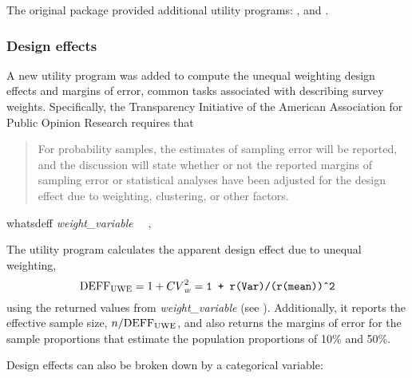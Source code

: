 The original package  provided additional utility programs:
,  and .

\subsubsection{Design effects}

A new utility program 
was added to compute the unequal weighting design effects and margins of error, common tasks associated
with describing survey weights. Specifically, the Transparency Initiative
of the American Association for Public Opinion Research
\citep{aapor:2014:ti:terms}
requires that

\begin{quote}
For probability samples, the estimates of sampling error will be reported, and the discussion will state whether or not the reported margins of sampling error or statistical analyses have been adjusted for the design effect due to weighting, clustering, or other factors.
\end{quote}


\begin{stsyntax}
whatsdeff
{\it weight\_variable}
\optif\
\optin\
,
\end{stsyntax}

The utility program  calculates the apparent design effect due to unequal weighting,
$${\rm DEFF_{UWE}}=1 + {CV}^2_w = \mbox{\texttt{1 + r(Var)/(r(mean))\^{}2}}$$
using the returned values from \stcmd{summarize} {\it weight{\_}variable} (see \stcmd{help return}).
Additionally, it reports the effective sample size, $n/{\rm DEFF_{UWE}}$, and also returns
the margins of error for the sample proportions that estimate the population proportions of
10\% and 50\%.

\noindent
\begin{stlog}
\nullskip
\end{stlog}

Design effects can also be broken down by a categorical variable:

\noindent
\begin{stlog}
\nullskip
\end{stlog}

